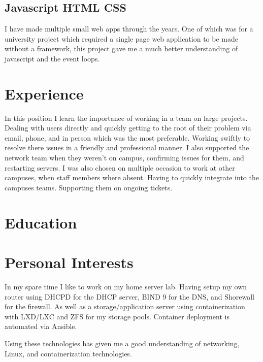 \documentclass[a4paper]{cv}
\begin{document}
\begin{minipage}[t]{0.33\textwidth}
\sectionspace
\subsection{Javascript \textbullet{} HTML \textbullet{} CSS}
\begin{flushleft}
I have made multiple small web apps through the years. One of which was for a university project which required a single page web application to be made without a framework, this project gave me a much better understanding of javascript and the event loops.
\end{flushleft}

\end{minipage}
\hfill
\begin{minipage}[t]{0.66\textwidth}    
\section{Experience}
In this position I learn the importance of working in a team on large projects. Dealing with users directly and quickly getting to the root of their problem via email, phone, and in person which was the most preferable. Working swiftly to resolve there issues in a friendly and professional manner. I also supported the network team when they weren't on campus, confirming issues for them, and restarting servers.
I was also chosen on multiple occasion to work at other campuses, when staff members where absent. Having to quickly integrate into the campuses teams. Supporting them on ongoing tickets.
\section{Education}
\sectionspace

\sectionspace


\section{Personal Interests}
In my spare time I like to work on my home server lab. Having setup my own router using DHCPD for the DHCP server, BIND 9 for the DNS, and Shorewall for the firewall. As well as a storage/application server using containerization with LXD/LXC and ZFS for my storage pools. Container deployment is automated via Ansible.

Using these technologies has given me a good understanding of networking, Linux, and containerization technologies.
\end{minipage}
\end{document}
